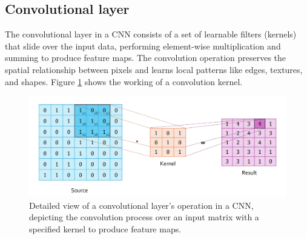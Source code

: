 \subsection{Convolutional layer}
The convolutional layer in a CNN consists of a set of learnable filters (kernels) that slide over the input data, performing element-wise multiplication and summing to produce feature maps. The convolution operation preserves the spatial relationship between pixels and learns local patterns like edges, textures, and shapes. Figure \ref{fig:Conv1} shows the working of a convolution kernel. 
\begin{figure}[ht]
    \centering
    \includegraphics[width=14cm]{images/Theory-DL/Conv1.png}
    \caption{Detailed view of a convolutional layer's operation in a CNN, depicting the convolution process over an input matrix with a specified kernel to produce feature maps.}
    \label{fig:Conv1}
  \end{figure}
